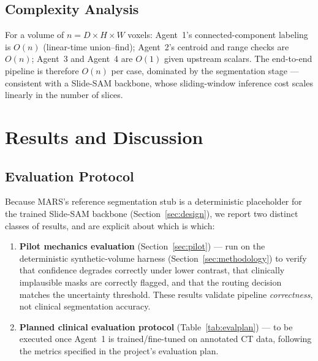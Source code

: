 \documentclass[11pt,a4paper]{article}
\begin{document}
\subsection{Complexity Analysis}
For a volume of $n = D\times H \times W$ voxels: Agent~1's connected-component labeling is $O(n)$ (linear-time union--find); Agent~2's centroid and range checks are $O(n)$; Agent~3 and Agent~4 are $O(1)$ given upstream scalars. The end-to-end pipeline is therefore $O(n)$ per case, dominated by the segmentation stage --- consistent with a Slide-SAM backbone, whose sliding-window inference cost scales linearly in the number of slices.

\section{Results and Discussion}
\label{sec:results}

\subsection{Evaluation Protocol}
Because MARS's reference segmentation stub is a deterministic placeholder for the trained Slide-SAM backbone (Section~\ref{sec:design}), we report two distinct classes of results, and are explicit about which is which:

\begin{enumerate}[leftmargin=1.4em]
    \item \textbf{Pilot mechanics evaluation} (Section~\ref{sec:pilot}) --- run on the deterministic synthetic-volume harness (Section~\ref{sec:methodology}) to verify that confidence degrades correctly under lower contrast, that clinically implausible masks are correctly flagged, and that the routing decision matches the uncertainty threshold. These results validate pipeline \emph{correctness}, not clinical segmentation accuracy.
    \item \textbf{Planned clinical evaluation protocol} (Table~\ref{tab:evalplan}) --- to be executed once Agent~1 is trained/fine-tuned on annotated CT data, following the metrics specified in the project's evaluation plan.
\end{enumerate}
\end{document}
